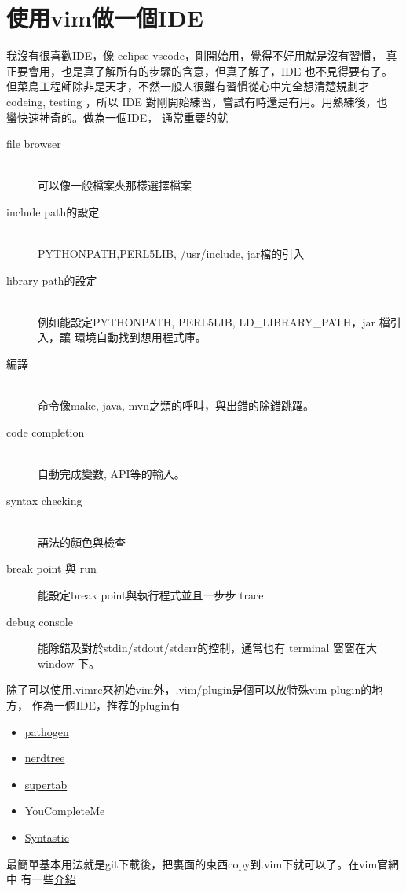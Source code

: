     \section{使用vim做一個IDE}
    我沒有很喜歡IDE，像 eclipse vscode，剛開始用，覺得不好用就是沒有習慣，
    真正要會用，也是真了解所有的步驟的含意，但真了解了，IDE 也不見得要有了。
    但菜鳥工程師除非是天才，不然一般人很難有習慣從心中完全想清楚規劃才 
    codeing, testing ，所以 IDE 對剛開始練習，嘗試有時還是有用。用熟練後，也
    蠻快速神奇的。做為一個IDE， 通常重要的就
    \begin{description}
      \item [file browser] \hfill \\
        可以像一般檔案夾那樣選擇檔案
      \item [include path的設定]\hfill \\
        PYTHONPATH,PERL5LIB, /usr/include, jar檔的引入
      \item [library path的設定] \hfill \\
        例如能設定PYTHONPATH, PERL5LIB, LD\_LIBRARY\_PATH，jar 檔引入，讓
        環境自動找到想用程式庫。
      \item [編譯] \hfill \\
        命令像make, java, mvn之類的呼叫，與出錯的除錯跳躍。
      \item [code completion] \hfill \\
        自動完成變數, API等的輸入。
      \item [syntax checking] \hfill \\
        語法的顏色與檢查
      \item [break point 與 run]
        能設定break point與執行程式並且一步步 trace
      \item [debug console] 
        能除錯及對於stdin/stdout/stderr的控制，通常也有 terminal 窗窗在大
        window 下。
    \end{description}
    除了可以使用.vimrc來初始vim外，.vim/plugin是個可以放特殊vim plugin的地方，
    作為一個IDE，推荐的plugin有
    \begin{itemize}
      \item \href{https://github.com/tpope/vim-pathogen}{pathogen}
      \item \href{https://github.com/scrooloose/nerdtree}{nerdtree}
      \item \href{https://github.com/ervandew/supertab}{supertab}
      \item \href{https://github.com/Valloric/YouCompleteMe}{YouCompleteMe}
      \item \href{https://github.com/scrooloose/syntastic}{Syntastic}
    \end{itemize}
    最簡單基本用法就是git下載後，把裏面的東西copy到.vim下就可以了。在vim官網中
    有一些\href{http://vim.wikia.com/wiki/Use\_Vim\_like\_an\_IDE}{介紹}

